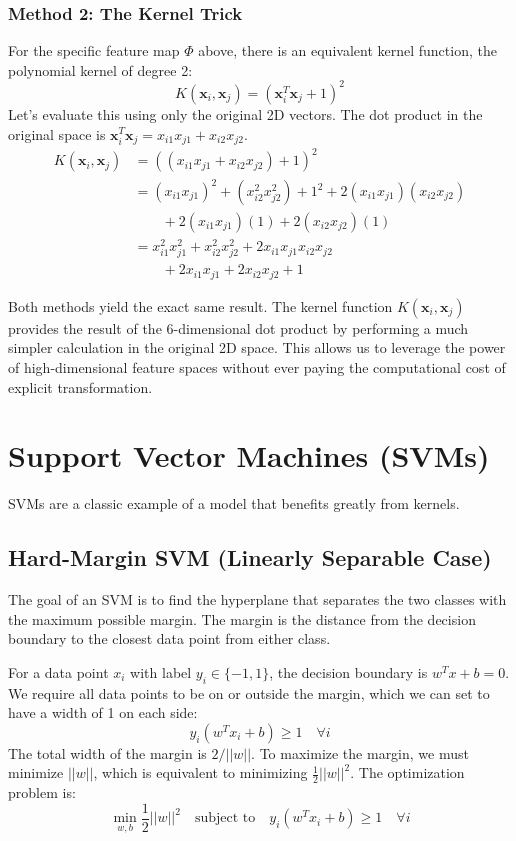\documentclass{article}
\begin{document}
\begin{multicols}{2}
\subsubsection{Method 2: The Kernel Trick}
For the specific feature map $\Phi$ above, there is an equivalent kernel function, the polynomial kernel of degree 2:
$$K(\mathbf{x}_i, \mathbf{x}_j) = (\mathbf{x}_i^T \mathbf{x}_j + 1)^2$$
Let's evaluate this using only the original 2D vectors. The dot product in the original space is $\mathbf{x}_i^T \mathbf{x}_j = x_{i1}x_{j1} + x_{i2}x_{j2}$.
\begin{align*}
    K(\mathbf{x}_i, \mathbf{x}_j) 
    &= ((x_{i1}x_{j1} + x_{i2}x_{j2}) + 1)^2 \\
    &= (x_{i1}x_{j1})^2 + (x_{i2}^2x_{j2}^2) + 1^2 + 2(x_{i1}x_{j1})(x_{i2}x_{j2}) \\
    &\qquad + 2(x_{i1}x_{j1})(1) + 2(x_{i2}x_{j2})(1) \\
    &= x_{i1}^2x_{j1}^2 + x_{i2}^2x_{j2}^2 + 2x_{i1}x_{j1}x_{i2}x_{j2} \\
    &\qquad + 2x_{i1}x_{j1} + 2x_{i2}x_{j2} + 1
\end{align*}

Both methods yield the exact same result. The kernel function $K(\mathbf{x}_i, \mathbf{x}_j)$ provides the result of the 6-dimensional dot product by performing a much simpler calculation in the original 2D space. This allows us to leverage the power of high-dimensional feature spaces without ever paying the computational cost of explicit transformation.

\section{Support Vector Machines (SVMs)}
SVMs are a classic example of a model that benefits greatly from kernels.

\subsection{Hard-Margin SVM (Linearly Separable Case)}
The goal of an SVM is to find the hyperplane that separates the two classes with the maximum possible margin. The margin is the distance from the decision boundary to the closest data point from either class.

For a data point $x_i$ with label $y_i \in \{-1, 1\}$, the decision boundary is $w^T x + b = 0$. We require all data points to be on or outside the margin, which we can set to have a width of 1 on each side:
$$ y_i(w^T x_i + b) \ge 1 \quad \forall i $$
The total width of the margin is $2/||w||$. To maximize the margin, we must minimize $||w||$, which is equivalent to minimizing $\frac{1}{2}||w||^2$. The optimization problem is:
$$ \min_{w, b} \frac{1}{2}||w||^2 \quad \text{subject to} \quad y_i(w^T x_i + b) \ge 1 \quad \forall i $$


\end{multicols}
\end{document}
